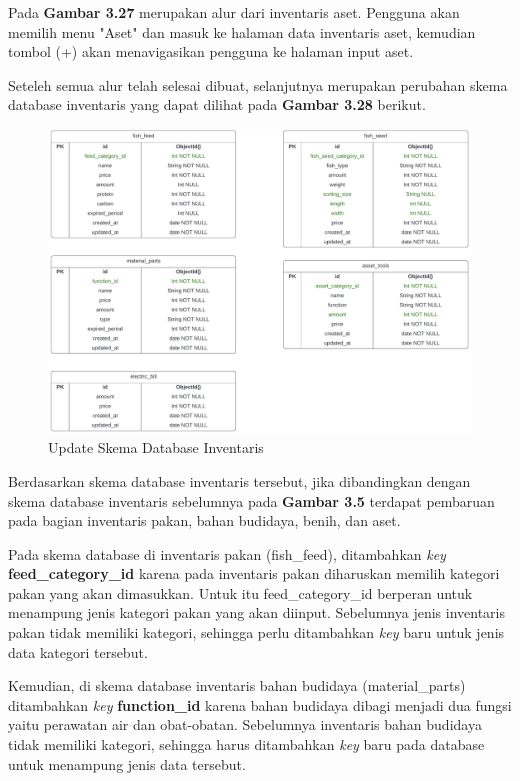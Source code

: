 \begin{enumerate}
\begin{enumerate}
		Pada \textbf{Gambar 3.27} merupakan alur dari inventaris aset. Pengguna akan memilih menu "Aset" dan masuk ke halaman data inventaris aset, kemudian tombol (+) akan menavigasikan pengguna ke halaman input aset.

		Seteleh semua alur telah selesai dibuat, selanjutnya merupakan perubahan skema database inventaris yang dapat dilihat pada \textbf{Gambar 3.28} berikut.

		\begin{figure}[H]
			\centering
			\includegraphics[width=1\textwidth]{gambar/sprint2/inventory_schema.jpeg}
			\caption{Update Skema Database Inventaris}
		\end{figure}

		Berdasarkan skema database inventaris tersebut, jika dibandingkan dengan skema database inventaris sebelumnya pada \textbf{Gambar 3.5} terdapat pembaruan pada bagian inventaris pakan, bahan budidaya, benih, dan aset.

		Pada skema database di inventaris pakan (fish\_feed), ditambahkan \textit{key} \textbf{feed\_category\_id} karena pada inventaris pakan diharuskan memilih kategori pakan yang akan dimasukkan. Untuk itu feed\_category\_id berperan untuk menampung jenis kategori pakan yang akan diinput. Sebelumnya jenis inventaris pakan tidak memiliki kategori, sehingga perlu ditambahkan \textit{key} baru untuk jenis data kategori tersebut.

		Kemudian, di skema database inventaris bahan budidaya (material\_parts) ditambahkan \textit{key} \textbf{function\_id} karena bahan budidaya dibagi menjadi dua fungsi yaitu perawatan air dan obat-obatan. Sebelumnya inventaris bahan budidaya tidak memiliki kategori, sehingga harus ditambahkan \textit{key} baru pada database untuk menampung jenis data tersebut.


\end{enumerate}
\end{enumerate}
